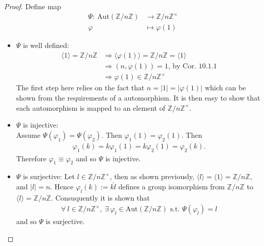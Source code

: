 \documentclass{article}
\theoremstyle{definition}
\theoremstyle{remark}
\begin{document}
\begin{proof}
	Define map
	\begin{align*}
		\Psi:~\mathrm{Aut}(\mathbb{Z}/n\mathbb{Z}) & \rightarrow\mathbb{Z}/n\mathbb{Z}^{\times} \\
		\varphi                                    & \mapsto\varphi(1)
	\end{align*}
	\begin{itemize}
		\item $\Psi$ is well defined:
		      \begin{align*}
			      \langle 1 \rangle = \mathbb{Z}/n\mathbb{Z} & \Rightarrow \langle \varphi(1)\rangle = \mathbb{Z}/n\mathbb{Z}=\langle 1 \rangle \\
			                                                 & \Rightarrow (n,\varphi(1))=1 \text{, by Cor. 10.1.1}                             \\
			                                                 & \Rightarrow \varphi(1)\in\mathbb{Z}/n\mathbb{Z}^{\times}
		      \end{align*}
		      The first step here relies on the fact that $n=|1| =|\varphi(1)|$ which can be shown from the requirements of a automorphism. It is then easy to show that each automorphism is mapped to an element of $\mathbb{Z}/n\mathbb{Z}^{\times}$.\\
		\item $\Psi$ is injective:\\
			  Assume $\Psi(\varphi_1)=\Psi(\varphi_2)$. Then $\varphi_1(1)=\varphi_2(1)$. Then
		      \begin{align*}
			      \varphi_1(k)=k\varphi_1(1)=k\varphi_2(1)=\varphi_2(k).
		      \end{align*}
			  Therefore $\varphi_1\equiv\varphi_2$ and so $\Psi$ is injective.\\
		\item $\Psi$ is surjective:
			  Let $l\in\mathbb{Z}/n\mathbb{Z}^{\times}$, then as shown previously, $\langle l\rangle =\langle 1\rangle=\mathbb{Z}/n\mathbb{Z}$, and $|l|=n$. Hence $\varphi_l(k):=\overline{kl}$ defines a group isomorphism from $\mathbb{Z}/n\mathbb{Z}$ to $\langle l\rangle=\mathbb{Z}/n\mathbb{Z}$. Consuquently it is shown that\\
		      \begin{align*}
			      \forall~l\in\mathbb{Z}/n\mathbb{Z}^{\times},~\exists~\varphi_l\in\mathrm{Aut}(\mathbb{Z}/n\mathbb{Z})\text{ s.t. }\Psi(\varphi_l)=l
		      \end{align*}
			  and so $\Psi$ is surjective.\\

\end{itemize}
\end{proof}
\end{document}
